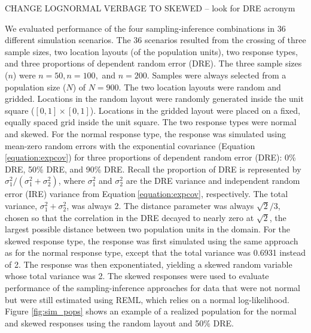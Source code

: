 \documentclass[]{elsarticle} %
\begin{document}
CHANGE LOGNORMAL VERBAGE TO SKEWED -- look for DRE acronym

We evaluated performance of the four sampling-inference combinations in
36 different simulation scenarios. The 36 scenarios resulted from the
crossing of three sample sizes, two location layouts (of the population
units), two response types, and three proportions of dependent random
error (DRE). The three sample sizes (\(n\)) were \(n = 50, n = 100,\)
and \(n = 200\). Samples were always selected from a population size
(\(N\)) of \(N = 900\). The two location layouts were random and
gridded. Locations in the random layout were randomly generated inside
the unit square (\([0, 1] \times [0, 1]\)). Locations in the gridded
layout were placed on a fixed, equally spaced grid inside the unit
square. The two response types were normal and skewed. For the normal
response type, the response was simulated using mean-zero random errors
with the exponential covariance (Equation\(~\)\ref{equation:expcov}) for
three proportions of dependent random error (DRE): 0\% DRE, 50\% DRE,
and 90\% DRE. Recall the proportion of DRE is represented by
\(\sigma^2_1 / (\sigma^2_1 + \sigma^2_2)\), where \(\sigma^2_1\) and
\(\sigma^2_2\) are the DRE variance and independent random error (IRE)
variance from Equation\(~\)\ref{equation:expcov}, respectively. The
total variance, \(\sigma^2_1 + \sigma^2_2\), was always 2. The distance
parameter was always \(\sqrt{2} / 3\), chosen so that the correlation in
the DRE decayed to nearly zero at \(\sqrt{2}\), the largest possible
distance between two population units in the domain. For the skewed
response type, the response was first simulated using the same approach
as for the normal response type, except that the total variance was
0.6931 instead of 2. The response was then exponentiated, yielding a
skewed random variable whose total variance was 2. The skewed responses
were used to evaluate performance of the sampling-inference approaches
for data that were not normal but were still estimated using REML, which
relies on a normal log-likelihood. Figure \ref{fig:sim_pops} shows an
example of a realized population for the normal and skewed responses
using the random layout and 50\% DRE.
\end{document}
